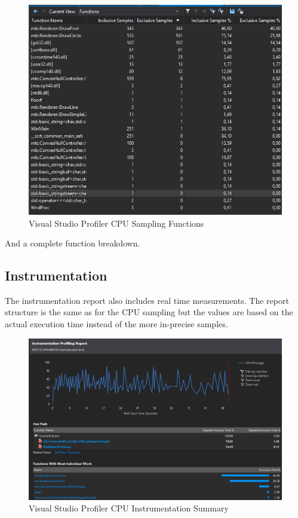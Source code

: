 \begin{figure}[htbp]
\includegraphics[scale = 0.42]{img/VisFunctions.PNG}
\caption{Visual Studio Profiler CPU Sampling Functions}
\label{fig:VisualStudioProfilerSamplingFunctions}
\end{figure}

And a complete function breakdown.

\subsection{Instrumentation}

The instrumentation report also includes real time measurements. The report structure is the same as for the CPU sampling but the
values are based on the actual execution time instead of the more in-precise samples.

\begin{figure}[htbp]
\includegraphics[scale = 0.275]{img/VisInstrumentationSummary.PNG}
\caption{Visual Studio Profiler CPU Instrumentation Summary}
\label{fig:VisualStudioProfilerInstrumentationSummary}
\end{figure}

